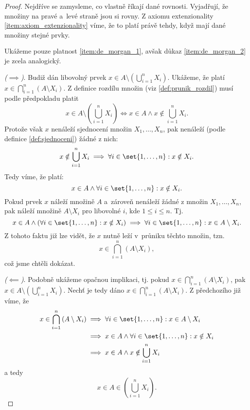 \begin{proof}
    Nejdříve se zamysleme, co vlastně říkají dané rovnosti. Vyjadřují, že množiny na pravé a~levé straně jsou si rovny. Z axiomu extenzionality \ref{item:axiom_extenzionality} víme, že to platí právě tehdy, když mají dané množiny stejné prvky.\par
    Ukážeme pouze platnost \ref{item:de_morgan_1}, avšak důkaz \ref{item:de_morgan_2} je zcela analogický.\par
    \textit{($\implies$)}. Budiž dán libovolný prvek $x\in A \setminus \left(\bigcup_{i=1}^{n}{X_i}\right)$. Ukážeme, že platí $x\in\bigcap_{i=1}^{n}{(A \setminus X_i)}$. Z definice rozdílu množin (viz \ref{def:prunik_rozdil}) musí podle předpokladu platit
    \begin{equation*}
        x\in A \setminus \left(\bigcup\limits_{i=1}^{n}{X_i}\right)\iff x\in A \land x\notin \bigcup\limits_{i=1}^{n}{X_i}.
    \end{equation*}
    Protože však $x$ nenáleží sjednocení množin $X_1,\dots,X_n$, pak nenáleží (podle definice \ref{def:sjednoceni}) žádné z nich:
    \begin{equation*}
        x\notin\bigcup\limits_{i=1}^{n}{X_i}\implies\forall i\in\set{1,\dots,n}: x\notin X_i.
    \end{equation*}
    Tedy víme, že platí:
    \begin{equation*}
        x\in A \land \forall i\in\set{1,\dots,n}: x\notin X_i.
    \end{equation*}
    Pokud prvek $x$ náleží množině $A$ a~zároveň nenáleží žádné z množin $X_1,\dots,X_n$, pak náleží množině $A\setminus X_i$ pro libovolné $i$, kde $1\leq i\leq n$. Tj.
    \begin{equation*}
        x\in A \land (\forall i\in\set{1,\dots,n}: x\notin X_i)\implies \forall i\in\set{1,\dots,n}: x\in A\setminus X_i.
    \end{equation*}
    Z tohoto faktu již lze vidět, že $x$ nutně leží v~průniku těchto množin, tzn.
    \begin{equation*}
        x\in\bigcap\limits_{i=1}^{n}{(A \setminus X_i)},
    \end{equation*} 
    což jsme chtěli dokázat.\par
    \textit{($\impliedby$)}. Podobně ukážeme opačnou implikaci, tj. pokud $x\in\bigcap_{i=1}^{n}{(A \setminus X_i)}$, pak $x\in A\setminus\left(\bigcup_{i=1}^{n}{X_i}\right)$. Nechť je tedy dáno $x\in\bigcap_{i=1}^{n}{(A \setminus X_i)}$. Z předchozího již víme, že
    \begin{align*}
        x\in\bigcap_{i=1}^{n}{(A \setminus X_i)} &\implies \forall i\in\set{1,\dots,n}: x\in A\setminus X_i\\
        &\implies x\in A\land\forall i\in\set{1,\dots,n}: x\notin X_i\\
        &\implies x\in A\land x\notin\bigcup_{i=1}^{n}{X_i}
    \end{align*}
    a tedy
    \begin{equation*}
        x\in A\in \left(\bigcup_{i=1}^{n}{X_i}\right).
    \end{equation*}
\end{proof}
